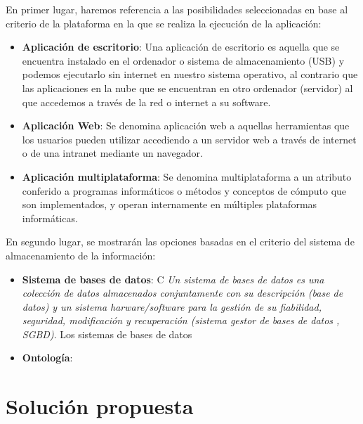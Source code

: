 En primer lugar, haremos referencia a las posibilidades seleccionadas en base al criterio de la plataforma en la que 
se realiza la ejecución de la aplicación: 
\begin{itemize}
    \item \textbf{Aplicación de escritorio}: Una aplicación de escritorio es aquella que se encuentra instalado en el 
    ordenador o sistema de almacenamiento (USB) y podemos ejecutarlo sin internet en nuestro sistema operativo, 
    al contrario que las aplicaciones en la nube que se encuentran en otro ordenador (servidor) al que accedemos 
    a través de la red o internet a su software.

    \item \textbf{Aplicación Web}: Se denomina aplicación web a aquellas herramientas que los usuarios pueden utilizar 
    accediendo a un servidor web a través de internet o de una intranet mediante un navegador.

    \item \textbf{Aplicación multiplataforma}: Se denomina multiplataforma a un atributo conferido a programas informáticos 
    o métodos y conceptos de cómputo que son implementados, y operan internamente en múltiples plataformas informáticas.

\end{itemize}

En segundo lugar, se mostrarán las opciones basadas en el criterio del sistema de almacenamiento de la información:
\begin{itemize}
    \item \textbf{Sistema de bases de datos}: C \textit{Un sistema de bases de datos es una colección de datos almacenados conjuntamente
    con su descripción \textnormal{(base de datos)} y un sistema harware/software para la gestión de su fiabilidad, seguridad, 
    modificación y recuperación \textnormal{{(sistema gestor de bases de datos , SGBD)}}}. Los sistemas de bases de datos
    \item \textbf{Ontología}:
\end{itemize}


\section{Solución propuesta}
\lorem

